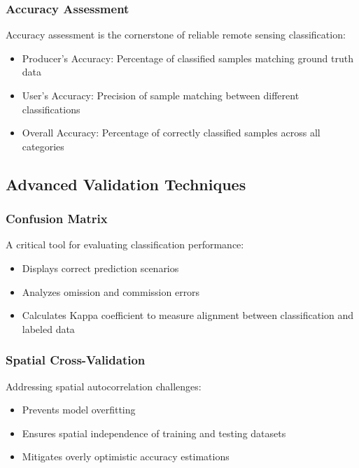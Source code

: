 \documentclass[
  letterpaper,
]{scrbook}
\begin{document}
\subsubsection{Accuracy Assessment}\label{accuracy-assessment-1}

Accuracy assessment is the cornerstone of reliable remote sensing
classification:

\begin{itemize}
\item
  Producer's Accuracy: Percentage of classified samples matching ground
  truth data
\item
  User's Accuracy: Precision of sample matching between different
  classifications
\item
  Overall Accuracy: Percentage of correctly classified samples across
  all categories
\end{itemize}

\subsection{Advanced Validation
Techniques}\label{advanced-validation-techniques}

\subsubsection{Confusion Matrix}\label{confusion-matrix}

A critical tool for evaluating classification performance:

\begin{itemize}
\item
  Displays correct prediction scenarios
\item
  Analyzes omission and commission errors
\item
  Calculates Kappa coefficient to measure alignment between
  classification and labeled data
\end{itemize}

\subsubsection{Spatial Cross-Validation}\label{spatial-cross-validation}

Addressing spatial autocorrelation challenges:

\begin{itemize}
\item
  Prevents model overfitting
\item
  Ensures spatial independence of training and testing datasets
\item
  Mitigates overly optimistic accuracy estimations
\end{itemize}
\end{document}
